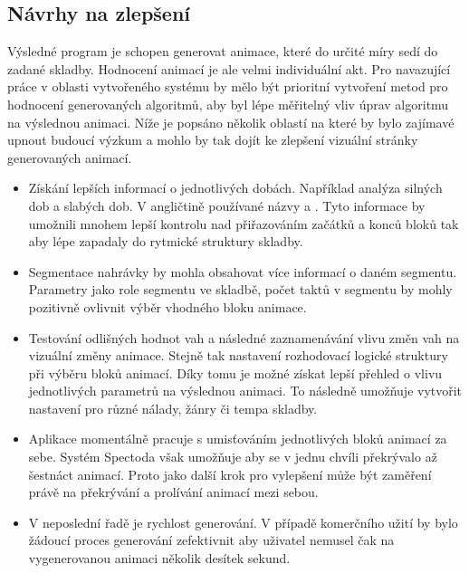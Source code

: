 \subsection{Návrhy na zlepšení} \label{sec:Hodnoceni_systemu}

Výsledné program je schopen generovat animace, které do určité míry sedí do zadané skladby. Hodnocení animací je ale velmi individuální akt. Pro navazující práce v oblasti vytvořeného systému by mělo být prioritní vytvoření metod pro hodnocení generovaných algoritmů, aby byl lépe měřitelný vliv úprav algoritmu na výslednou animaci. Níže je popsáno několik oblastí na které by bylo zajímavé upnout budoucí výzkum a mohlo by tak dojít ke zlepšení vizuální stránky generovaných animací. 
\begin{itemize}
    \item Získání lepších informací o jednotlivých dobách. Například analýza silných dob a slabých dob. V angličtině používané názvy  a . Tyto informace by umožnili mnohem lepší kontrolu nad přiřazováním začátků a konců bloků tak aby lépe zapadaly do rytmické struktury skladby.
    \item Segmentace nahrávky by mohla obsahovat více informací o daném segmentu. Parametry jako role segmentu ve skladbě, počet taktů v segmentu by mohly pozitivně ovlivnit výběr vhodného bloku animace.
    \item Testování odlišných hodnot vah a následné zaznamenávání vlivu změn vah na vizuální změny animace. Stejně tak nastavení rozhodovací logické struktury při výběru bloků animací. Díky tomu je možné získat lepší přehled o vlivu jednotlivých parametrů na výslednou animaci. To následně umožňuje vytvořit nastavení pro různé nálady, žánry či tempa skladby. 
    \item Aplikace momentálně pracuje s umisťováním jednotlivých bloků animací za sebe. Systém Spectoda však umožňuje aby se v jednu chvíli překrývalo až šestnáct animací. Proto jako další krok pro vylepšení může být zaměření právě na překrývání a prolívání animací mezi sebou. 
    \item V neposlední řadě je rychlost generování. V případě komerčního užití by bylo žádoucí proces generování zefektivnit aby uživatel nemusel čak na vygenerovanou animaci několik desítek sekund. 
\end{itemize}

